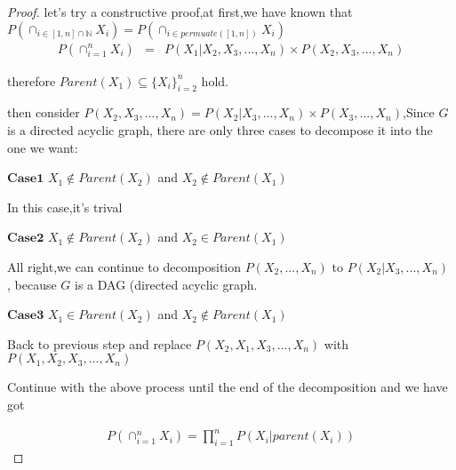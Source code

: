 \documentclass[12pt,a4paper,violet]{bbe}
\begin{document}
    \begin{proof}
    
        let's try a constructive proof,at first,we have known that $P(\cap_{ i \in [1,n] \cap \mathbb{N}} X_i) = P(\cap_{ i \in permuate([1,n])} X_i)$ 
        \begin{equation*}
        \begin{aligned}
             P(\cap_{i=1}^{n} X_i) & = & P(X_1 | X_2,X_3,...,X_n) \times P(X_2 ,X_3,...,X_n)
        \end{aligned}
        \end{equation*}
        
        therefore $Parent(X_1) \subseteq \{X_i\}_{i=2}^{n}$ hold.
        
        then consider $P(X_2 ,X_3,...,X_n) = P(X_2 | X_3,...,X_n) \times P(X_3,...,X_n)$,Since $G$ is a directed acyclic graph, there are only three cases to decompose it into the one we want:
        
        $\textbf{Case1}$ $X_1 \notin Parent(X_2)$ and $X_2 \notin Parent(X_1)$
        
        In this case,it's trival
        
        $\textbf{Case2}$ $X_1 \notin Parent(X_2)$ and $X_2 \in Parent(X_1)$
        
        All right,we can continue to decomposition $P(X_2,...,X_n) $ to $P(X_2 | X_3,...,X_n)$ , because $G$ is a DAG (directed acyclic graph.
        
        $\textbf{Case3}$ $X_1 \in Parent(X_2)$ and $X_2 \notin Parent(X_1)$
        
        Back to previous step and replace $P(X_2,X_1,X_3,...,X_n)$ with $P(X_1,X_2,X_3,...,X_n)$
        
        Continue with the above process until the end of the decomposition and we have got 
        
        \begin{equation*}
            \begin{aligned}
                P(\cap_{i=1}^{n} X_i) = \prod_{i = 1}^{n} P(X_i | parent(X_i))
            \end{aligned}
        \end{equation*}
        
    \end{proof}
    
        
\end{document}
